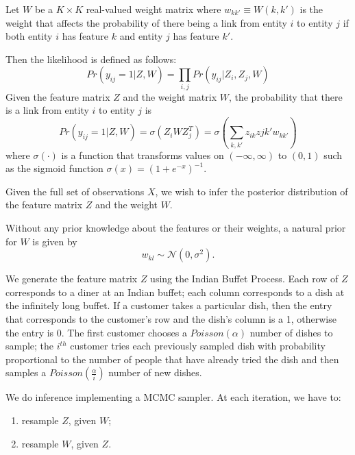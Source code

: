 \documentclass[]{article}
\begin{document}
Let $W$ be a $K \times K$ real-valued weight matrix where $w_{kk'} \equiv W(k, k')$ is the weight that affects the probability of there being a link from entity $i$ to entity $j$ if both entity $i$ has feature $k$ and entity $j$ has feature $k'$.

Then the likelihood is defined as follows:
$$
Pr(y_{ij}=1|Z,W) = \prod_{i,j}Pr(y_{ij}|Z_i,Z_j,W)
$$
Given the feature matrix $Z$ and the weight matrix $W$, the probability that there is a link from entity $i$ to entity $j$ is
$$
Pr(y_{ij}=1|Z,W) = \sigma(Z_iWZ_j^T) = \sigma(\sum_{k,k'}z_{ik}z{jk'}w_{kk'}) 
$$
where $\sigma(\cdot)$ is a function that transforms values on $(-\infty, \infty)$ to $(0,1)$ such as the sigmoid function $\sigma(x) = (1+e^{-x})^{-1}$.

Given the full set of observations $X$, we wish to infer the posterior distribution of the feature matrix $Z$ and the weight $W$.

Without any prior knowledge about the features or their weights, a natural prior for $W$ is given by 
$$
w_{kl} \sim \mathcal{N}(0,\sigma^2).
$$

We generate the feature matrix $Z$ using the Indian Buffet Process. Each row of $Z$ corresponds to a diner at an Indian buffet; each column corresponds to a dish at the infinitely long buffet. If a customer takes a particular dish, then the entry that corresponds to the customer's row and the dish's column is a 1, otherwise the entry is 0. The first customer chooses a $Poisson(\alpha)$ number of dishes to sample; the $i^{th}$ customer tries each previously sampled dish with probability proportional to the number of people that have already tried the dish and then samples a $Poisson(\frac{\alpha}{i})$ number of new dishes. 

We do inference implementing a MCMC sampler. At each iteration, we have to:
\begin{enumerate}
	\item resample $Z$, given $W$;
	\item resample $W$, given $Z$.
\end{enumerate}
\end{document}
